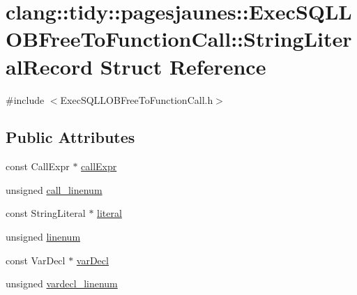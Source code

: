 \hypertarget{structclang_1_1tidy_1_1pagesjaunes_1_1_exec_s_q_l_l_o_b_free_to_function_call_1_1_string_literal_record}{}\section{clang\+:\+:tidy\+:\+:pagesjaunes\+:\+:Exec\+S\+Q\+L\+L\+O\+B\+Free\+To\+Function\+Call\+:\+:String\+Literal\+Record Struct Reference}
\label{structclang_1_1tidy_1_1pagesjaunes_1_1_exec_s_q_l_l_o_b_free_to_function_call_1_1_string_literal_record}


{\ttfamily \#include $<$Exec\+S\+Q\+L\+L\+O\+B\+Free\+To\+Function\+Call.\+h$>$}

\subsection*{Public Attributes}
\begin{DoxyCompactItemize}
\item 
const Call\+Expr $\ast$ \hyperlink{structclang_1_1tidy_1_1pagesjaunes_1_1_exec_s_q_l_l_o_b_free_to_function_call_1_1_string_literal_record_abca3900dd3301c3f0724e454a58907e3}{call\+Expr}
\item 
unsigned \hyperlink{structclang_1_1tidy_1_1pagesjaunes_1_1_exec_s_q_l_l_o_b_free_to_function_call_1_1_string_literal_record_a7f38c404c15577ac4e544486a094543f}{call\+\_\+linenum}
\item 
const String\+Literal $\ast$ \hyperlink{structclang_1_1tidy_1_1pagesjaunes_1_1_exec_s_q_l_l_o_b_free_to_function_call_1_1_string_literal_record_a7549ca1d09a2088256ebfb5aeba8598a}{literal}
\item 
unsigned \hyperlink{structclang_1_1tidy_1_1pagesjaunes_1_1_exec_s_q_l_l_o_b_free_to_function_call_1_1_string_literal_record_a30676aa67727ef0d8350fac0e2ac336f}{linenum}
\item 
const Var\+Decl $\ast$ \hyperlink{structclang_1_1tidy_1_1pagesjaunes_1_1_exec_s_q_l_l_o_b_free_to_function_call_1_1_string_literal_record_a9f7cf46d8dca6f00fd1a72dd1c3fb4d7}{var\+Decl}
\item 
unsigned \hyperlink{structclang_1_1tidy_1_1pagesjaunes_1_1_exec_s_q_l_l_o_b_free_to_function_call_1_1_string_literal_record_aacfa11ed16c03a5aaf44883678254bb8}{vardecl\+\_\+linenum}
\end{DoxyCompactItemize}


